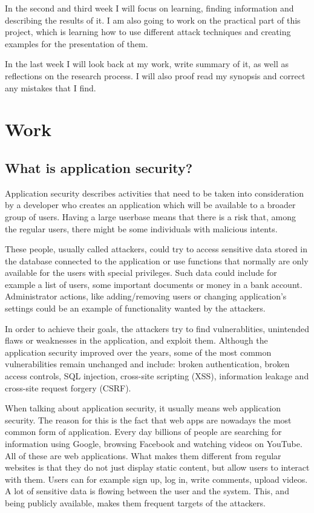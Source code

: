 \documentclass[a4paper]{article}
\begin{document}
In the second and third week I will focus on learning, finding information and describing the results of it. I am also going to work on the practical part of this project, which is learning how to use different attack techniques and creating examples for the presentation of them.

In the last week I will look back at my work, write summary of it, as well as reflections on the research process. I will also proof read my synopsis and correct any mistakes that I find.

\newpage

\section{Work}

\subsection{What is application security?}

Application security describes activities that need to be taken into consideration by a developer who creates an application which will be available to a broader group of users. Having a large userbase means that there is a risk that, among the regular users, there might be some individuals with malicious intents.

These people, usually called attackers, could try to access sensitive data stored in the database connected to the application or use functions that normally are only available for the users with special privileges. Such data could include for example a list of users, some important documents or money in a bank account. Administrator actions, like adding/removing users or changing application's settings could be an example of functionality wanted by the attackers.

In order to achieve their goals, the attackers try to find vulnerablities, unintended flaws or weaknesses in the application, and exploit them. Although the application security improved over the years, some of the most common vulnerabilities remain unchanged and include: broken authentication, broken access controls, SQL injection, cross-site scripting (XSS), information leakage and cross-site request forgery (CSRF).

When talking about application security, it usually means web application security. The reason for this is the fact that web apps are nowadays the most common form of application. Every day billions of people are searching for information using Google, browsing Facebook and watching videos on YouTube. All of these are web applications. What makes them different from regular websites is that they do not just display static content, but allow users to interact with them. Users can for example sign up, log in, write comments, upload videos. A lot of sensitive data is flowing between the user and the system. This, and being publicly available, makes them frequent targets of the attackers.
\end{document}
